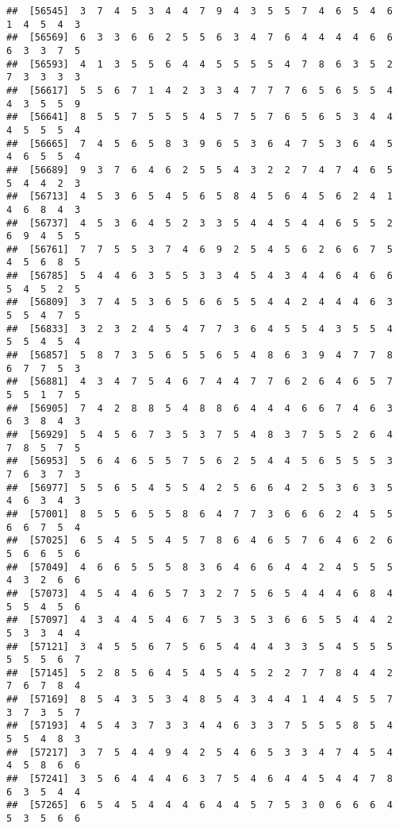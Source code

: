 \documentclass[
]{book}
\begin{document}
\begin{verbatim}
##  [56545]  3  7  4  5  3  4  4  7  9  4  3  5  5  7  4  6  5  4  6  1  4  5  4  3
##  [56569]  6  3  3  6  6  2  5  5  6  3  4  7  6  4  4  4  4  6  6  6  3  3  7  5
##  [56593]  4  1  3  5  5  6  4  4  5  5  5  5  4  7  8  6  3  5  2  7  3  3  3  3
##  [56617]  5  5  6  7  1  4  2  3  3  4  7  7  7  6  5  6  5  5  4  4  3  5  5  9
##  [56641]  8  5  5  7  5  5  5  4  5  7  5  7  6  5  6  5  3  4  4  4  5  5  5  4
##  [56665]  7  4  5  6  5  8  3  9  6  5  3  6  4  7  5  3  6  4  5  4  6  5  5  4
##  [56689]  9  3  7  6  4  6  2  5  5  4  3  2  2  7  4  7  4  6  5  5  4  4  2  3
##  [56713]  4  5  3  6  5  4  5  6  5  8  4  5  6  4  5  6  2  4  1  4  6  8  4  3
##  [56737]  4  5  3  6  4  5  2  3  3  5  4  4  5  4  4  6  5  5  2  6  9  4  5  5
##  [56761]  7  7  5  5  3  7  4  6  9  2  5  4  5  6  2  6  6  7  5  4  5  6  8  5
##  [56785]  5  4  4  6  3  5  5  3  3  4  5  4  3  4  4  6  4  6  6  5  4  5  2  5
##  [56809]  3  7  4  5  3  6  5  6  6  5  5  4  4  2  4  4  4  6  3  5  5  4  7  5
##  [56833]  3  2  3  2  4  5  4  7  7  3  6  4  5  5  4  3  5  5  4  5  5  4  5  4
##  [56857]  5  8  7  3  5  6  5  5  6  5  4  8  6  3  9  4  7  7  8  6  7  7  5  3
##  [56881]  4  3  4  7  5  4  6  7  4  4  7  7  6  2  6  4  6  5  7  5  5  1  7  5
##  [56905]  7  4  2  8  8  5  4  8  8  6  4  4  4  6  6  7  4  6  3  6  3  8  4  3
##  [56929]  5  4  5  6  7  3  5  3  7  5  4  8  3  7  5  5  2  6  4  7  8  5  7  5
##  [56953]  5  6  4  6  5  5  7  5  6  2  5  4  4  5  6  5  5  5  3  7  6  3  7  3
##  [56977]  5  5  6  5  4  5  5  4  2  5  6  6  4  2  5  3  6  3  5  4  6  3  4  3
##  [57001]  8  5  5  6  5  5  8  6  4  7  7  3  6  6  6  2  4  5  5  6  6  7  5  4
##  [57025]  6  5  4  5  5  4  5  7  8  6  4  6  5  7  6  4  6  2  6  5  6  6  5  6
##  [57049]  4  6  6  5  5  5  8  3  6  4  6  6  4  4  2  4  5  5  5  4  3  2  6  6
##  [57073]  4  5  4  4  6  5  7  3  2  7  5  6  5  4  4  4  6  8  4  5  5  4  5  6
##  [57097]  4  3  4  4  5  4  6  7  5  3  5  3  6  6  5  5  4  4  2  5  3  3  4  4
##  [57121]  3  4  5  5  6  7  5  6  5  4  4  4  3  3  5  4  5  5  5  5  5  5  6  7
##  [57145]  5  2  8  5  6  4  5  4  5  4  5  2  2  7  7  8  4  4  2  7  6  7  8  4
##  [57169]  8  5  4  3  5  3  4  8  5  4  3  4  4  1  4  4  5  5  7  3  7  3  5  7
##  [57193]  4  5  4  3  7  3  3  4  4  6  3  3  7  5  5  5  8  5  4  5  5  4  8  3
##  [57217]  3  7  5  4  4  9  4  2  5  4  6  5  3  3  4  7  4  5  4  4  5  8  6  6
##  [57241]  3  5  6  4  4  4  6  3  7  5  4  6  4  4  5  4  4  7  8  6  3  5  4  4
##  [57265]  6  5  4  5  4  4  4  6  4  4  5  7  5  3  0  6  6  6  4  5  3  5  6  6

\end{verbatim}
\end{document}
